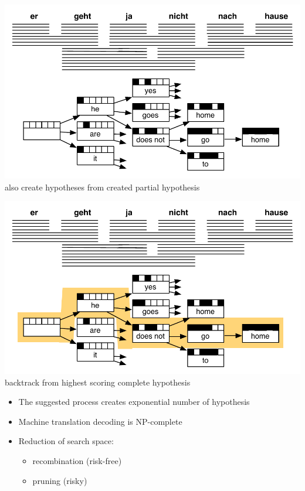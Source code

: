 \documentclass[landscape]{slides}
\begin{document}

\begin{center} 
\includegraphics[scale=1.3]{decoding-step5.pdf}\\
also create hypotheses from created partial hypothesis
\end{center}


\begin{center}
\includegraphics[scale=1.3]{decoding-step6.pdf}\\[1mm]
backtrack from highest scoring complete hypothesis
\end{center}


\begin{itemize}\vspace{25mm}
\item The suggested process creates exponential number of hypothesis 
\item Machine translation decoding is NP-complete
\item Reduction of search space:
\begin{itemize}
\item recombination (risk-free)
\item pruning (risky)
\end{itemize}
\end{itemize}
\end{document}
